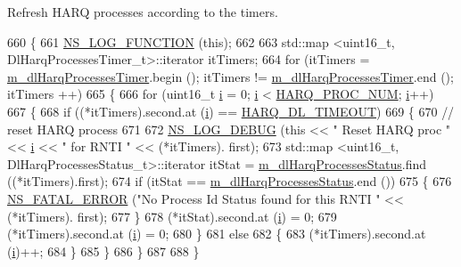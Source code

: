 Refresh H\+A\+RQ processes according to the timers. 


\begin{DoxyCode}
660 \{
661   \hyperlink{log-macros-disabled_8h_a90b90d5bad1f39cb1b64923ea94c0761}{NS\_LOG\_FUNCTION} (\textcolor{keyword}{this});
662 
663   std::map <uint16\_t, DlHarqProcessesTimer\_t>::iterator itTimers;
664   \textcolor{keywordflow}{for} (itTimers = \hyperlink{classns3_1_1FdTbfqFfMacScheduler_ae7a4cdc82a971f39b2238c472ceedf62}{m\_dlHarqProcessesTimer}.begin (); itTimers != 
      \hyperlink{classns3_1_1FdTbfqFfMacScheduler_ae7a4cdc82a971f39b2238c472ceedf62}{m\_dlHarqProcessesTimer}.end (); itTimers ++)
665     \{
666       \textcolor{keywordflow}{for} (uint16\_t \hyperlink{bernuolliDistribution_8m_a6f6ccfcf58b31cb6412107d9d5281426}{i} = 0; \hyperlink{bernuolliDistribution_8m_a6f6ccfcf58b31cb6412107d9d5281426}{i} < \hyperlink{cqa-ff-mac-scheduler_8h_a9185d8d7d2b2979181d4a7044a3d3555}{HARQ\_PROC\_NUM}; \hyperlink{bernuolliDistribution_8m_a6f6ccfcf58b31cb6412107d9d5281426}{i}++)
667         \{
668           \textcolor{keywordflow}{if} ((*itTimers).second.at (\hyperlink{bernuolliDistribution_8m_a6f6ccfcf58b31cb6412107d9d5281426}{i}) == \hyperlink{cqa-ff-mac-scheduler_8h_add9e0c4889dc1b5b25686480b31ad166}{HARQ\_DL\_TIMEOUT})
669             \{
670               \textcolor{comment}{// reset HARQ process}
671               
672               \hyperlink{group__logging_ga413f1886406d49f59a6a0a89b77b4d0a}{NS\_LOG\_DEBUG} (\textcolor{keyword}{this} << \textcolor{stringliteral}{" Reset HARQ proc "} << \hyperlink{bernuolliDistribution_8m_a6f6ccfcf58b31cb6412107d9d5281426}{i} << \textcolor{stringliteral}{" for RNTI "} << (*itTimers).
      first);
673               std::map <uint16\_t, DlHarqProcessesStatus\_t>::iterator itStat = 
      \hyperlink{classns3_1_1FdTbfqFfMacScheduler_abc7e2984f379ab5a1855d815c439fa4f}{m\_dlHarqProcessesStatus}.find ((*itTimers).first);
674               \textcolor{keywordflow}{if} (itStat == \hyperlink{classns3_1_1FdTbfqFfMacScheduler_abc7e2984f379ab5a1855d815c439fa4f}{m\_dlHarqProcessesStatus}.end ())
675                 \{
676                   \hyperlink{group__fatal_ga5131d5e3f75d7d4cbfd706ac456fdc85}{NS\_FATAL\_ERROR} (\textcolor{stringliteral}{"No Process Id Status found for this RNTI "} << (*itTimers).
      first);
677                 \}
678               (*itStat).second.at (\hyperlink{bernuolliDistribution_8m_a6f6ccfcf58b31cb6412107d9d5281426}{i}) = 0;
679               (*itTimers).second.at (\hyperlink{bernuolliDistribution_8m_a6f6ccfcf58b31cb6412107d9d5281426}{i}) = 0;
680             \}
681           \textcolor{keywordflow}{else}
682             \{
683               (*itTimers).second.at (\hyperlink{bernuolliDistribution_8m_a6f6ccfcf58b31cb6412107d9d5281426}{i})++;
684             \}
685         \}
686     \}
687   
688 \}
\end{DoxyCode}


